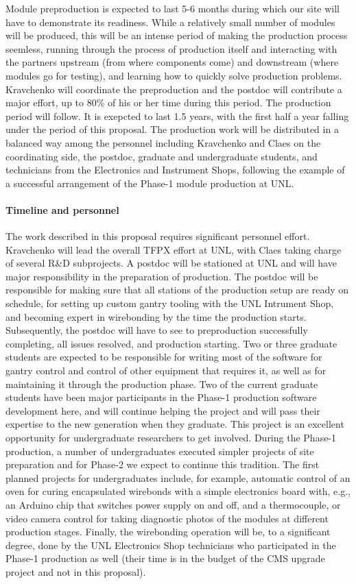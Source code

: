 Module preproduction is expected to last 5-6 months during which our site will have to demonstrate its readiness. While a relatively small number of modules will be produced, this will be an intense period of making the production process seemless, running through the process of production itself and interacting with the partners upstream (from where components come) and downstream (where modules go for testing), and learning how to quickly solve production problems. Kravchenko will coordinate the preproduction and the postdoc will contribute a major effort, up to 80\% of his or her time during this period. The production period will follow. It is exepcted to last 1.5 years, with the first half a year falling under the period of this proposal. The production work will be distributed in a balanced way among the personnel including Kravchenko and Claes on the coordinating side, the postdoc, graduate and undergraduate students, and technicians from the Electronics and Instrument Shops, following the example of a successful arrangement of the Phase-1 module production at UNL.

\paragraph{Timeline and personnel}

The work described in this proposal requires significant personnel effort. Kravchenko will lead the overall TFPX effort at UNL, with Claes taking charge of several R\&D subprojects. A postdoc will be stationed at UNL and will have major responsibility in the preparation of production. The postdoc will be responsible for making sure that all stations of the production setup are ready on schedule, for setting up custom gantry tooling with the UNL Intrument Shop, and becoming expert in wirebonding by the time the production starts. Subsequently, the postdoc will have to see to preproduction successfully completing, all issues resolved, and production starting. Two or three graduate students are expected to be responsible for writing most of the software for gantry control and control of other equipment that requires it, as well as for maintaining it through the production phase. Two of the current graduate students have been major participants in the Phase-1 production software development here, and will continue helping the project and will pass their expertise to the new generation when they graduate. This project is an excellent opportunity for undergraduate researchers to get involved. During the Phase-1 production, a number of undergraduates executed simpler projects of site preparation and for Phase-2 we expect to continue this tradition. The first planned projects for undergraduates include, for example, automatic control of an oven for curing encapsulated wirebonds with a simple electronics board with, e.g., an Arduino chip that switches power supply on and off, and a thermocouple, or video camera control for taking diagnostic photos of the modules at different production stages. Finally, the wirebonding operation will be, to a significant degree, done by the UNL Electronics Shop technicians who participated in the Phase-1 production as well (their time is in the budget of the CMS upgrade project and not in this proposal).

